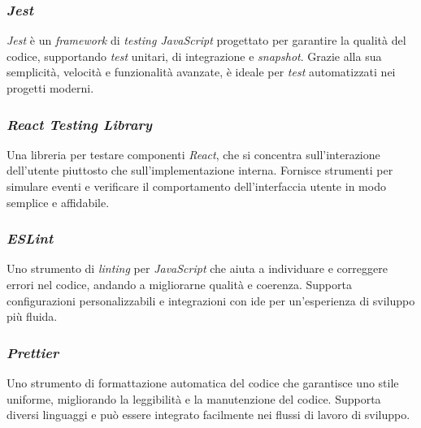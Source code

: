 \subsubsection{\textit{Jest}}

\textit{Jest} è un \textit{framework} di \textit{testing JavaScript} progettato per garantire la qualità del codice, supportando \textit{test} unitari, di integrazione e \textit{snapshot}.
Grazie alla sua semplicità, velocità e funzionalità avanzate, è ideale per \textit{test} automatizzati nei progetti moderni.

\subsubsection{\textit{React Testing Library}}

Una libreria per testare componenti \textit{React}, che si concentra sull'interazione dell'utente piuttosto che sull'implementazione interna. 
Fornisce strumenti per simulare eventi e verificare il comportamento dell'interfaccia utente in modo semplice e affidabile.

\subsubsection{\textit{ESLint}}

Uno strumento di \textit{linting} per \textit{JavaScript} che aiuta a individuare e correggere errori nel codice, andando a migliorarne qualità e coerenza.
Supporta configurazioni personalizzabili e integrazioni con \gls{ide} per un'esperienza di sviluppo più fluida.

\subsubsection{\textit{Prettier}}

Uno strumento di formattazione automatica del codice che garantisce uno stile uniforme, migliorando la leggibilità e la manutenzione del codice. 
Supporta diversi linguaggi e può essere integrato facilmente nei flussi di lavoro di sviluppo.